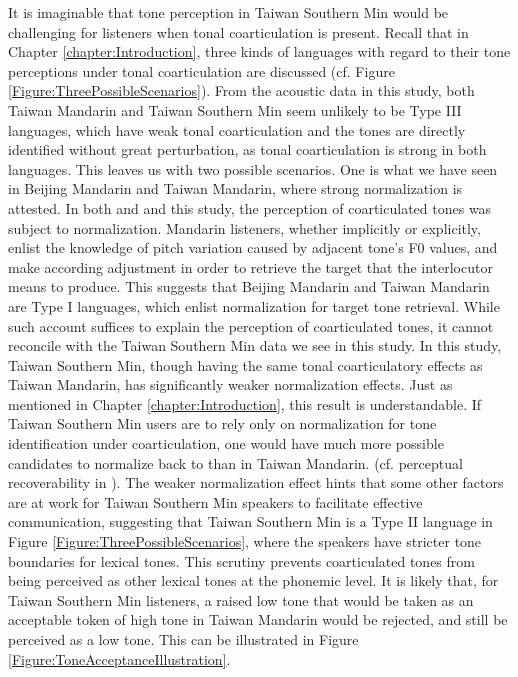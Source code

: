 It is imaginable that tone perception in Taiwan Southern Min would be challenging for listeners when tonal coarticulation is present. Recall that in Chapter \ref{chapter:Introduction}, three kinds of languages with regard to their tone perceptions under tonal coarticulation are discussed (cf. Figure \ref{Figure:ThreePossibleScenarios}). From the acoustic data in this study, both Taiwan Mandarin and Taiwan Southern Min seem unlikely to be Type III languages, which have weak tonal coarticulation and the tones are directly identified without great perturbation, as tonal coarticulation is strong in both languages. This leaves us with two possible scenarios. One is what we have seen in Beijing Mandarin and Taiwan Mandarin, where strong normalization is attested. In both \cite{Xu1994} and \citeauthor{Zhangetal2022} and this study, the perception of coarticulated tones was subject to normalization. Mandarin listeners, whether implicitly or explicitly, enlist the knowledge of pitch variation caused by adjacent tone's F0 values, and make according adjustment in order to retrieve the target that the interlocutor means to produce. This suggests that Beijing Mandarin and Taiwan Mandarin are Type I languages, which enlist normalization for target tone retrieval. While such account suffices to explain the perception of coarticulated tones, it cannot reconcile with the Taiwan Southern Min data we see in this study. In this study, Taiwan Southern Min, though having the same tonal coarticulatory effects as Taiwan Mandarin, has significantly weaker normalization effects. Just as mentioned in Chapter \ref{chapter:Introduction}, this result is understandable. If Taiwan Southern Min users are to rely only on normalization for tone identification under coarticulation, one would have much more possible candidates to normalize back to than in Taiwan Mandarin. (cf. perceptual recoverability in \citealp{Flemming2011}). The weaker normalization effect hints that some other factors are at work for Taiwan Southern Min speakers to facilitate effective communication, suggesting that Taiwan Southern Min is a Type II language in Figure \ref{Figure:ThreePossibleScenarios}, where the speakers have stricter tone boundaries for lexical tones. This scrutiny prevents coarticulated tones from being perceived as other lexical tones at the phonemic level. It is likely that, for Taiwan Southern Min listeners, a raised low tone that would be taken as an acceptable token of high tone in Taiwan Mandarin would be rejected, and still be perceived as a low tone. This can be illustrated in Figure \ref{Figure:ToneAcceptanceIllustration}. 
